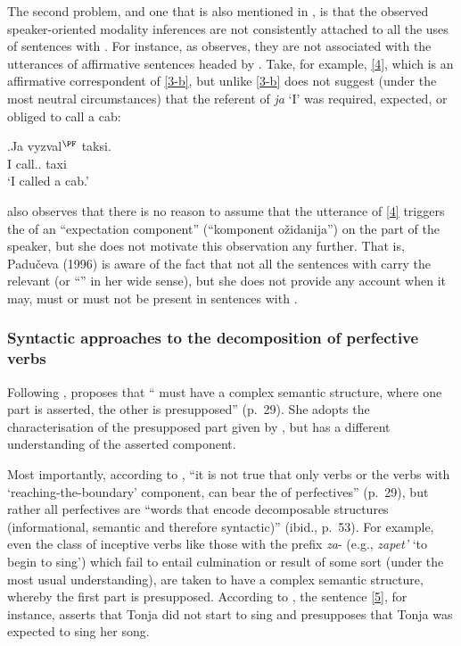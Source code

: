 The second problem, and one that is also mentioned in \citealt{Gronn:04}, is that the observed speaker-oriented modality inferences are not consistently attached to all the uses of sentences with . For instance, as \citet{Gronn:04} observes, they are not associated with the utterances of affirmative sentences headed by . Take, for example, \ref{4}, which is an affirmative correspondent of \ref{3-b}, but unlike \ref{3-b} does not suggest (under the most neutral circumstances) that the referent of \textit{ja} `I' was required, expected, or obliged to call a cab:

\exg.\label{4}Ja vyzval$^{\PF}$ taksi.\\
 I call.. taxi\\
 \trans `I called a cab.'
 
\citet[56]{Paducheva:96} also observes that there is no reason to assume that the utterance of \ref{4} triggers the  of an ``expectation component'' (``komponent o\v{z}idanija'') on the part of the speaker, but she does not motivate this observation any further. That is, Padu\v{c}eva (1996) is aware of the fact that not all the sentences with  carry the relevant  (or ``'' in her wide sense), but she does not provide any account when it may, must or must not be present in sentences with . 
 
\subsubsection{Syntactic approaches to the decomposition of perfective verbs}
Following \citet{Paducheva:96}, \citet{Romanova:06} proposes that `` must have a complex semantic structure, where one part is asserted, the other is presupposed'' (p.~29). She adopts the characterisation of the presupposed part given by \citet{Paducheva:96}, but has a different understanding of the asserted component. 

 Most importantly, according to \citet{Romanova:06}, ``it is not true that only  verbs or the verbs with `reaching-the-boundary' component, can bear the  of perfectives'' (p.~29), but rather all perfectives are ``words that encode decomposable structures (informational, semantic and therefore syntactic)'' (ibid., p.~53). For example, even the class of inceptive verbs like those with the prefix \textit{za}-  (e.g., \textit{zapet'} `to begin to sing') which fail to entail culmination or result of some sort (under the most usual understanding), are taken to have a complex semantic structure, whereby the first part is presupposed. According to \citet{Romanova:06}, the sentence \ref{5}, for instance, asserts that Tonja did not start to sing and presupposes that Tonja was expected to sing her song.
 
